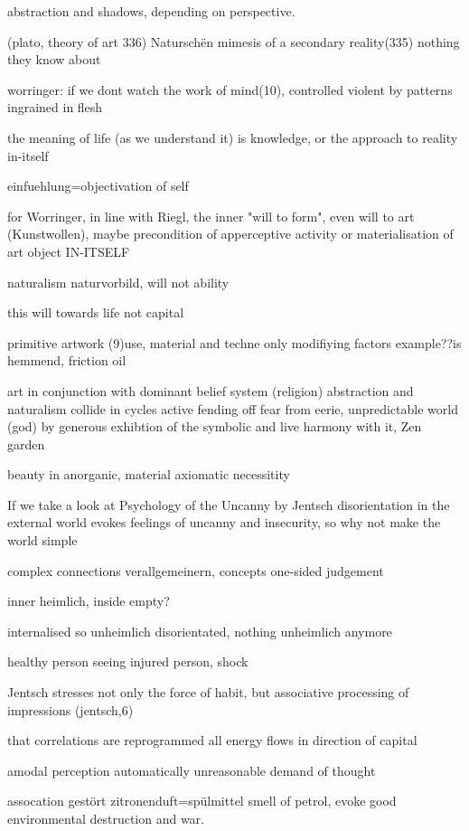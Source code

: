 \documentclass{article}
\begin{document}
abstraction and shadows, depending on perspective.


(plato, theory of art 336)
Natursch\"{e}n mimesis of a secondary reality(335)
nothing they know about

worringer: if we dont watch the work of mind(10), 
controlled 
violent by patterns ingrained in flesh




the meaning of life (as we understand it)
is knowledge, or the approach to reality in-itself

einfuehlung=objectivation of self


for Worringer, in line with Riegl, 
the inner "will to form", even will to art (Kunstwollen),
maybe precondition of apperceptive activity
or materialisation of art object IN-ITSELF 

naturalism
naturvorbild,  
will not ability

this will towards life not capital


primitive artwork
(9)use, material and techne only modifiying factors
example??is hemmend, friction 
oil



art in conjunction with dominant belief system (religion)
abstraction and naturalism collide in cycles
active fending off fear from eerie, unpredictable world (god)
by generous exhibtion of the symbolic
and live harmony with it, Zen garden

beauty in anorganic, material axiomatic necessitity



If we take a look at Psychology of the Uncanny by Jentsch
disorientation in the external world evokes feelings of  uncanny 
and insecurity, so why not make the world simple

complex connections
verallgemeinern, concepts
one-sided judgement

inner heimlich, inside empty?

internalised 
so unheimlich disorientated, nothing unheimlich anymore

healthy person seeing injured person, shock


Jentsch stresses 
not only the force of habit,
but associative processing of impressions (jentsch,6)

that correlations are reprogrammed
all energy flows in direction of capital


amodal perception automatically
unreasonable demand of thought 

assocation gestört zitronenduft=spülmittel
smell of petrol, evoke good 
environmental destruction and war.
\end{document}
